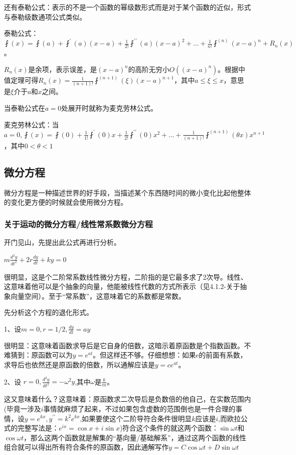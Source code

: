 \documentclass[UTF8]{ctexbook}
\newcommand{\derivative}{^\prime}
\newcommand{\doubleDerivative}{^{\prime\prime}}
\newcommand{\aLotDerivative}[1]{^{(#1)}}
\newcommand{\fDerivative}[1]{\fint\derivative(#1)}
\newcommand{\defFunction}[1]{\fint(#1)}
\begin{document}
{{{{还有泰勒公式：表示的不是一个函数的幂级数形式而是对于某个函数的近似，形式与泰勒级数通项公式类似。

泰勒公式：$\defFunction{x} = \defFunction{a} + \fDerivative{a}(x - a) + \frac{1}{2!}\fint\doubleDerivative(a)(x - a)^2 + ... + \frac{1}{n!}\fint\aLotDerivative{n}(x - a)^n + R_n(x)$。

$R_n(x)$是余项，表示误差，是$(x - a)^n$的高阶无穷小$O((x - a)^n)$。根据中值定理可得$R_n(x) = \frac{1}{(n + 1)!}\fint\aLotDerivative{n + 1}(\xi)(x - a)^{n+1}$，其中$a \leq \xi \leq x$，意思是$\xi$介于$a$和$x$之间。

当泰勒公式在$a = 0$处展开时就称为麦克劳林公式。

麦克劳林公式：当$a = 0, \defFunction{x} = \defFunction{0} + \frac{1}{1!}\fDerivative{0}x + \frac{1}{2!}\fint\doubleDerivative(0)x^2 + ... + \frac{1}{(n + 1)!}\fint\aLotDerivative{n + 1}(\theta x)x^{n+1}$，其中$0 < \theta < 1$

}%

}%

\subsection{微分方程}{
微分方程是一种描述世界的好手段，当描述某个东西随时间的微小变化比起他整体的变化更方便的时候就会使用微分方程。

\subsubsection{关于运动的微分方程/线性常系数微分方程}{
开门见山，先提出此公式再进行分析。

$m\frac{d^2y}{dt^2} + 2r\frac{dy}{dt} + ky = 0$

很明显，这是个二阶常系数线性微分方程，二阶指的是它最多求了2次导。线性、这意味着他可以是个抽象的向量，他能被线性代数的方式所表示（见4.1.2-关于抽象向量空间）。至于“常系数”，这意味着它的系数都是常数。

先分析这个方程的退化形式。

1、设$m = 0, r = 1/2, \frac{dy}{dt} = ay$

很明显：这意味着函数求导后是它自身的倍数，这暗示着原函数是个指数函数。不难猜到：原函数可以为$y = e^{at}$。但这样还不够。仔细想想：如果e的前面有系数，求导后也依然还是原函数的倍数，所以通解应该是$y = ce^{at}$。

2、设 $r = 0, \frac{d^2y}{dt^2} = -\omega^2y$,其中$\omega$是$\frac{k}{m}$。

这又意味着什么？这意味着：原函数求二次导后是负数倍的他自己，在实数范围内(毕竟一涉及$i$事情就麻烦了起来，不过如果包含虚数的范围倒也是一件合理的事情，设$y=e^{kx},y\doubleDerivative = k^{2}e^{kx}$,如果要使这个二阶导符合条件很明显$k$应该是$i$,而欧拉公式的完整写法是：$e^{ix} = \cos x + i\sin x$)符合这个条件的就这两个函数：$\sin\omega t$和$\cos\omega t$，那么这两个函数就是解集的“基向量/基础解系”，通过这两个函数的线性组合就可以得出所有符合条件的原函数，因此通解写作$y = C\cos\omega t + D\sin\omega t$

}}}}
\end{document}
